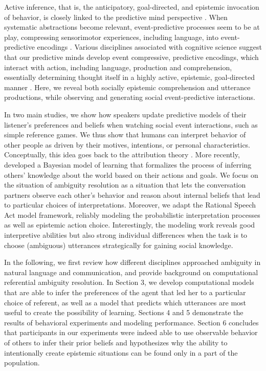 \documentclass[10pt,a4paper]{article}
\begin{document}
Active inference, that is, the anticipatory, goal-directed, and epistemic invocation of behavior, is
closely linked to the predictive mind perspective \cite{Friston:2015,Hohwy:2013,Clark:2016}. 
When systematic abstractions become relevant, event-predictive processes seem to be at play, compressing sensorimotor experiences, including language, into event-predictive encodings \cite{Butz:2016,Butz:2017a}.
Various disciplines associated with cognitive science suggest that our predictive minds develop event compressive, predictive encodings, which interact with action, including language, production and comprehension, essentially determining thought itself in a highly active, epistemic, goal-directed manner  \cite{Baldwin:2019tsi,DuBrow:2019tsi,Elsner:2019tsi,Fallgatter:2019tsi,Knott:2019tsi,Papafragou:2019tsi,Zacks:2019tsi}.
Here, we reveal both socially epistemic comprehension and utterance productions, while observing and generating social event-predictive interactions.

In two main studies, we show how speakers update predictive models of their listener's preferences and beliefs when watching social event interactions, such as simple reference games. 
We thus show that humans can interpret behavior of other people as driven by their motives, intentions, or personal characteristics.
Conceptually, this idea goes back to the attribution theory \cite{jones1965acts, kelley1967attribution, kelley1970social}.
More recently,  developed a Bayesian model of learning that formalizes the process of inferring others' knowledge about the world based on their actions and goals. 
We focus on the situation of ambiguity resolution as a situation that lets the conversation partners observe each other's behavior and reason about internal beliefs that lead to particular choices of interpretations.
Moreover, we adapt the Rational Speech Act model framework, reliably modeling the probabilistic interpretation processes as well as epistemic action choice. 
Interestingly, the modeling work reveals good interpretive abilities but also strong individual differences when the task is to choose (ambiguous) utterances strategically for gaining social knowledge. 


In the following, we first review how different disciplines approached ambiguity in natural language and communication, and provide background on computational referential ambiguity resolution. 
In Section 3, we develop computational models that are able to infer the preferences of the agent that led her to a particular choice of referent, as well as a model that predicts which utterances are most useful to create the possibility of learning. 
Sections 4 and 5 demonstrate the results of behavioral experiments and modeling performance. 
Section 6 concludes that participants in our experiments were indeed able to use observable behavior of others to infer their prior beliefs and hypothesizes why the ability to intentionally create epistemic situations can be found only in a part of the population.
\end{document}
